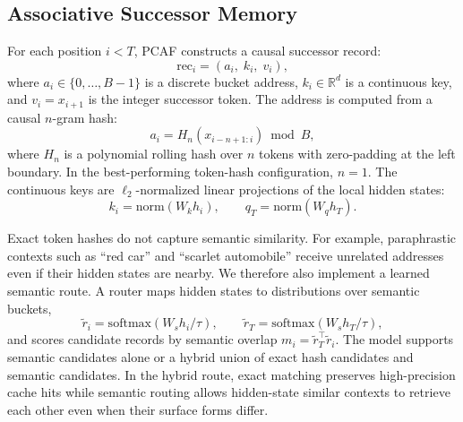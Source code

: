 \documentclass{article}
\begin{document}
\subsection{Associative Successor Memory}

For each position $i < T$, PCAF constructs a causal successor record:
\begin{equation}
  \mathrm{rec}_i = (a_i,\; k_i,\; v_i),
\end{equation}
where $a_i \in \{0,\ldots,B-1\}$ is a discrete bucket address,
$k_i \in \mathbb{R}^d$ is a continuous key, and $v_i = x_{i+1}$ is the integer
successor token. The address is computed from a causal $n$-gram hash:
\begin{equation}
  a_i = H_n(x_{i-n+1:i}) \bmod B,
\end{equation}
where $H_n$ is a polynomial rolling hash over $n$ tokens with zero-padding at
the left boundary. In the best-performing token-hash configuration, $n=1$. The
continuous keys are $\ell_2$-normalized linear projections of the local hidden
states:
\begin{equation}
  k_i = \mathrm{norm}(W_k h_i), \qquad q_T = \mathrm{norm}(W_q h_T).
\end{equation}

Exact token hashes do not capture semantic similarity. For example,
paraphrastic contexts such as ``red car'' and ``scarlet automobile'' receive
unrelated addresses even if their hidden states are nearby. We therefore also
implement a learned semantic route. A router maps hidden states to distributions
over semantic buckets,
\begin{equation}
  \tilde{r}_i = \mathrm{softmax}(W_s h_i / \tau), \qquad
  \tilde{r}_T = \mathrm{softmax}(W_s h_T / \tau),
\end{equation}
and scores candidate records by semantic overlap
$m_i = \tilde{r}_T^\top \tilde{r}_i$. The model supports semantic candidates
alone or a hybrid union of exact hash candidates and semantic candidates. In the
hybrid route, exact matching preserves high-precision cache hits while semantic
routing allows hidden-state similar contexts to retrieve each other even when
their surface forms differ.
\end{document}
